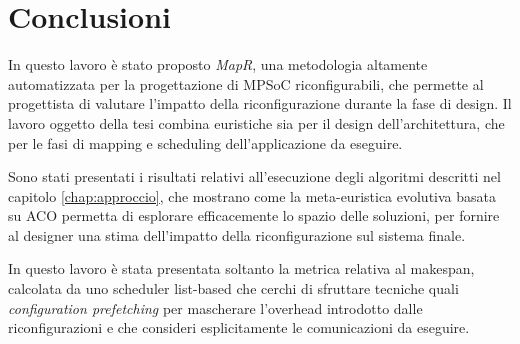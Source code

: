 \chapter{Conclusioni}
\label{chap:conclusioni}
\vspace{1cm}
In questo lavoro \`e stato proposto \emph{MapR}, una metodologia
altamente automatizzata per la progettazione di \acs{MPSoC} riconfigurabili, che permette
al progettista di valutare l'impatto della riconfigurazione durante la fase di design.
Il lavoro oggetto della tesi combina euristiche sia per il design dell'architettura, che per
le fasi di mapping e scheduling dell'applicazione da eseguire.

Sono stati presentati i risultati relativi all'esecuzione degli algoritmi descritti
nel capitolo \ref{chap:approccio}, che mostrano come la meta-euristica evolutiva basata
su \ac{ACO} permetta di esplorare efficacemente lo spazio delle soluzioni,
per fornire al designer una stima dell'impatto della riconfigurazione sul sistema finale.

In questo lavoro \`e stata presentata soltanto la metrica relativa al makespan,
calcolata da uno scheduler list-based che cerchi di sfruttare tecniche quali
\emph{configuration prefetching} per mascherare l'overhead introdotto dalle
riconfigurazioni e che consideri esplicitamente le comunicazioni da eseguire.

